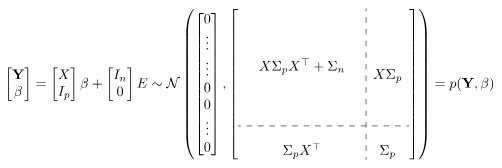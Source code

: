 \begin{gather}
    \begin{bmatrix}
        \mathbf{Y} \\
        \beta
    \end{bmatrix}
    = \begin{bmatrix} X \\ I_p \end{bmatrix} \beta + \begin{bmatrix} I_n \\ 0 \end{bmatrix}  E
    \sim \N \left(
        \begin{bmatrix}
        0 \\
        \vdots \\
        \vdots \\
        0 \\
        0 \\
        \vdots \\
        0
        \end{bmatrix},
        \left[
        \begin{array}{ c:c c c }
            \begin{matrix}
                & & \\
                & & \\
                & & \\
                & X \Sigma_p X^{\top} + \Sigma_n & \\
                & & \\
                & & \\
                & & \\
            \end{matrix}
            & \begin{matrix} \\ \\ \\ X \Sigma_p  \\ \\ \\ \end{matrix} \\
            \hdashline \\
            \begin{matrix} &  \Sigma_p X^{\top} & \end{matrix} & \Sigma_p
        \end{array}
        \right]
        \right)
    = p(\mathbf{Y}, \beta)
\end{gather}


